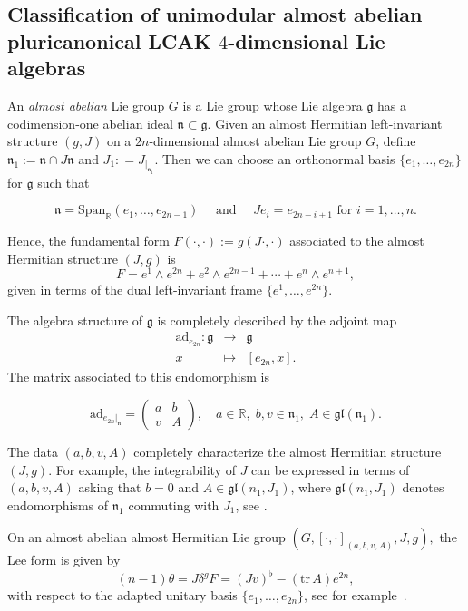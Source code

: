\documentclass[a4paper,11pt]{amsart}
\theoremstyle{definition}
\renewcommand{\[}{\begin{equation*}}
\renewcommand{\]}{\end{equation*}}
\DeclareMathOperator\tr{tr}
\def \R {\mathbb R}
\def \g {\mathfrak g}
\def \n {\mathfrak n}
\def \tr {\mbox{tr}}
\def \ad {\mbox{ad}}
\begin{document}
\subsection{Classification of unimodular almost abelian pluricanonical LCAK $4$-dimensional Lie algebras}

 An {\it almost abelian} Lie group $G$ is a Lie group whose Lie algebra $\g$ has a codimension-one abelian ideal $\n\subset \g$. Given an almost Hermitian left-invariant structure $(g,J)$ on a $2n$-dimensional almost abelian Lie group $G$, define $\n_1:=\n\cap J\n$ and $J_1: = J_{|_{\n_1}}$. Then we can choose an orthonormal basis $\{e_1,\ldots,e_{2n}\}$ for $\g$ such that 

   $$ \n=\mbox{Span}_\R(e_1,\ldots,e_{2n-1}) \quad \text{ and } \quad Je_i=e_{2n-i+1} \text{ for } i=1,\ldots,n.  $$

    Hence, the fundamental form $F(\cdot,\cdot):=g(J\cdot,\cdot)$ associated to the almost Hermitian structure $(J,g)$ is
    $$ F = e^1\wedge e^{2n} + e^2\wedge e^{2n-1} + \cdots + e^n\wedge e^{n+1},$$
    given in terms of the dual left-invariant frame $\{e^1,\ldots,e^{2n}\}$.

    The algebra structure of $\g$ is completely described by the adjoint map 
    \begin{eqnarray*}  
    \mbox{ad}_{e_{2n}}: \g& \rightarrow& \g \\
     x &\mapsto& [e_{2n},x].\end{eqnarray*}
     The matrix associated to this endomorphism is
    
    \begin{equation}\label{eq: ad_e_2n}
        \ad_{e_{2n}|_\n} = \begin{pmatrix} 
        a & b \\
        v & A
        \end{pmatrix}, \quad a \in\R,\; b,v \in \n_1,\; A\in\mathfrak{gl}(\n_1).
    \end{equation}
    
    The data $(a,b,v,A)$ completely characterize the almost Hermitian structure $(J,g)$. For example, the integrability of $J$ can be expressed in terms of $(a,b,v,A)$ asking that $b=0$ and $A\in\mathfrak{gl}(n_1,J_1)$, where $\mathfrak{gl}(n_1,J_1)$ denotes endomorphisms of $\n_1$ commuting with $J_1$, see \cite[Lemma 4.1]{MR3957836}.
    
    On an almost abelian almost Hermitian Lie group $\left(G,[\cdot,\cdot]_{(a,b,v,A)},J,g\right),$ the Lee form is given by
    \begin{equation}\label{lee-form}
        (n-1)\theta = J\delta^gF = (Jv)^{\flat} - (\tr\,A)e^{2n},
    \end{equation}
    with respect to the adapted unitary basis $\{e_1,\ldots,e_{2n}\}$, see for example~\cite{MR4466741}.
    
\end{document}
